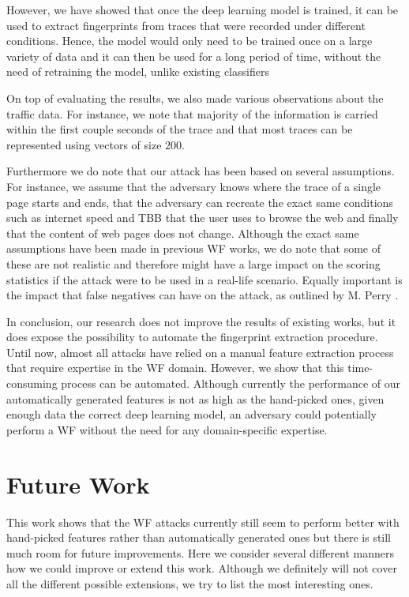 However, we have showed that once the deep learning model is trained, it can be used to extract fingerprints from traces that were recorded under different conditions.
Hence, the model would only need to be trained once on a large variety of data and it can then be used for a long period of time, without the need of retraining the model, unlike existing classifiers

On top of evaluating the results, we also made various observations about the traffic data.
For instance, we note that majority of the information is carried within the first couple seconds of the trace and that most traces can be represented using vectors of size $200$.

\newpage

Furthermore we do note that our attack has been based on several assumptions.
For instance, we assume that the adversary knows where the trace of a single page starts and ends, that the adversary can recreate the exact same conditions such as internet speed and TBB that the user uses to browse the web and finally that the content of web pages does not change.
Although the exact same assumptions have been made in previous WF works, we do note that some of these are not realistic and therefore might have a large impact on the scoring statistics if the attack were to be used in a real-life scenario.
Equally important is the impact that false negatives can have on the attack, as outlined by M. Perry \cite{wfpcritique}.


In conclusion, our research does not improve the results of existing works, but it does expose the possibility to automate the fingerprint extraction procedure.
Until now, almost all attacks have relied on a manual feature extraction process that require expertise in the WF domain.
However, we show that this time-consuming process can be automated.
Although currently the performance of our automatically generated features is not as high as the hand-picked ones, given enough data the correct deep learning model, an adversary could potentially perform a WF without the need for any domain-specific expertise.

\section{Future Work} \label{sec:future-works}

This work shows that the WF attacks currently still seem to perform better with hand-picked features rather than automatically generated ones but there is still much room for future improvements.
Here we consider several different manners how we could improve or extend this work.
Although we definitely will not cover all the different possible extensions, we try to list the most interesting ones.


